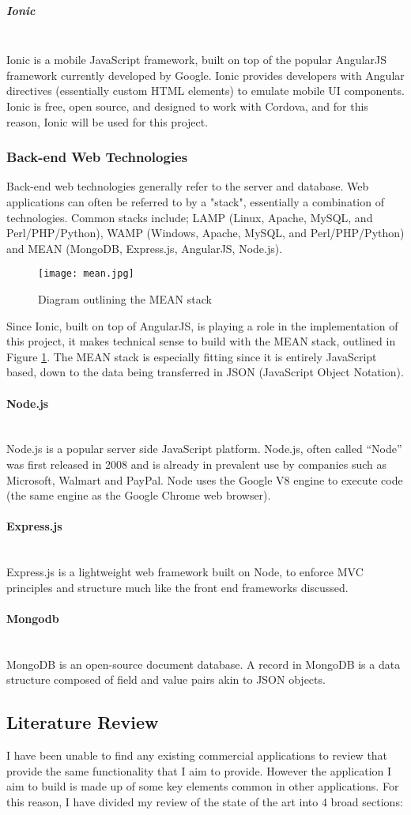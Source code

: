 \documentclass[a4paper]{article}
\newcommand{\subsubsubsection}[1]{\paragraph{#1}\mbox{}\\}
\newcommand{\subsubsubsubsection}[1]{\subparagraph{#1}\mbox{}\\}
\begin{document}
\subsubsubsubsection{Ionic}
Ionic is a mobile JavaScript framework, built on top of the popular AngularJS framework currently developed by Google. Ionic provides developers with Angular directives (essentially custom HTML elements) to emulate mobile UI components. Ionic is free, open source, and designed to work with Cordova, and for this reason, Ionic will be used for this project.


\subsubsection{Back-end Web Technologies}
Back-end web technologies generally refer to the server and database. Web applications can often be referred to by a "stack", essentially a combination of technologies. Common stacks include; LAMP (Linux, Apache, MySQL, and Perl/PHP/Python), WAMP (Windows, Apache, MySQL, and Perl/PHP/Python) and MEAN (MongoDB, Express.js, AngularJS, Node.js).

\begin{figure}[H]
  \centering
    \texttt{[image: mean.jpg]}
     \caption{Diagram outlining the MEAN stack}
     \label{fig:meanOutline}
\end{figure}

Since Ionic, built on top of AngularJS, is playing a role in the implementation of this project, it makes technical sense to build with the MEAN stack, outlined in Figure \ref{fig:meanOutline}. The MEAN stack is especially fitting since it is entirely JavaScript based, down to the data being transferred in JSON (JavaScript Object Notation).

\subsubsubsection{Node.js}
Node.js is a popular server side JavaScript platform. Node.js, often called ``Node'' was first released in 2008 \cite{node_history} and is already in prevalent use by companies such as Microsoft, Walmart and PayPal. Node uses the Google V8 engine to execute code (the same engine as the Google Chrome web browser).

\subsubsubsection{Express.js}
Express.js is a lightweight web framework built on Node, to enforce MVC principles and structure much like the front end frameworks discussed.


\subsubsubsection{Mongodb}
MongoDB is an open-source document database. A record in MongoDB is a data structure composed of field and value pairs akin to JSON objects. 


\subsection{Literature Review}
I have been unable to find any existing commercial applications to review that provide the same functionality that I aim to provide. However the application I aim to build is made up of some key elements common in other applications. For this reason, I have divided my review of the state of the art into 4 broad sections:
\end{document}
